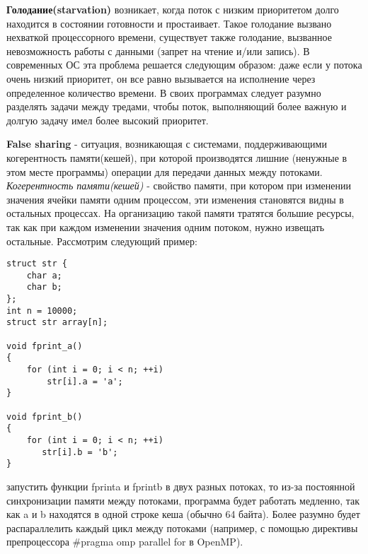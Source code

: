 {	\par\textbf{Голодание(starvation)} возникает, когда поток с низким приоритетом долго находится в состоянии готовности и простаивает. Такое голодание вызвано нехваткой процессорного времени, существует также голодание, вызванное невозможность работы с данными (запрет на чтение и/или запись). В современных ОС эта проблема решается следующим образом: даже если у потока очень низкий приоритет, он все равно вызывается на исполнение через определенное количество времени. В своих программах следует разумно разделять задачи между тредами, чтобы поток, выполняющий более важную и долгую задачу имел более высокий приоритет.
	\par\textbf{False sharing} - ситуация, возникающая с системами, поддерживающими когерентность памяти(кешей), при которой производятся лишние (ненужные в этом месте программы) операции для передачи данных между потоками. \textit{Когерентность памяти(кешей)} - свойство памяти, при котором при изменении значения ячейки памяти одним процессом, эти изменения становятся видны в остальных процессах. На организацию такой памяти тратятся большие ресурсы, так как при каждом изменении значения одним потоком, нужно извещать остальные. Рассмотрим следующий пример: 
		\begin{verbatim}struct str { 
    char a; 
    char b;  
};
int n = 10000;
struct str array[n];

void fprint_a() 
{ 
    for (int i = 0; i < n; ++i) 
        str[i].a = 'a';
} 

void fprint_b() 
{ 
    for (int i = 0; i < n; ++i) 
       str[i].b = 'b';
} \end{verbatim}
	 запустить функции fprint\textunderscore a и fprint\textunderscore b в двух разных потоках, то из-за постоянной синхронизации памяти между потоками, программа будет работать медленно, так как a и b находятся в одной строке кеша (обычно 64 байта). Более разумно будет распараллелить каждый цикл между потоками (например, с помощью директивы препроцессора \#pragma omp parallel for в OpenMP).
}